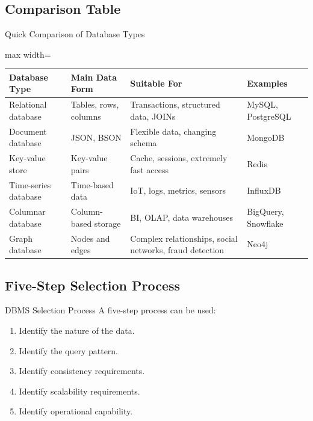 \documentclass[aspectratio=169,11pt]{beamer}
\newcommand{\smallitem}{\setlength{\itemsep}{2pt}\setlength{\parskip}{0pt}}
\begin{document}
\subsection{Comparison Table}

\begin{frame}{Quick Comparison of Database Types}
\scriptsize
\begin{adjustbox}{max width=\textwidth}
\begin{tabularx}{1.08\textwidth}{>{\raggedright\arraybackslash}p{}>{\raggedright\arraybackslash}p{}>{\raggedright\arraybackslash}p{}>{\raggedright\arraybackslash}X}
\toprule
\textbf{Database Type} & \textbf{Main Data Form} & \textbf{Suitable For} & \textbf{Examples} \\
\midrule
Relational database & Tables, rows, columns & Transactions, structured data, JOINs & MySQL, PostgreSQL \\
Document database & JSON, BSON & Flexible data, changing schema & MongoDB \\
Key-value store & Key-value pairs & Cache, sessions, extremely fast access & Redis \\
Time-series database & Time-based data & IoT, logs, metrics, sensors & InfluxDB \\
Columnar database & Column-based storage & BI, OLAP, data warehouses & BigQuery, Snowflake \\
Graph database & Nodes and edges & Complex relationships, social networks, fraud detection & Neo4j \\
\bottomrule
\end{tabularx}
\end{adjustbox}
\end{frame}

\subsection{Five-Step Selection Process}
\begin{frame}{DBMS Selection Process}
A five-step process can be used:
\begin{enumerate}
  \smallitem
  \item Identify the nature of the data.
  \item Identify the query pattern.
  \item Identify consistency requirements.
  \item Identify scalability requirements.
  \item Identify operational capability.
\end{enumerate}
\end{frame}
\end{document}
